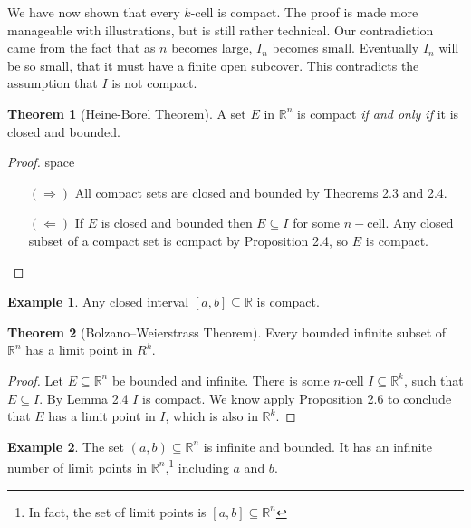 \documentclass{article}
\newcommand{\R}{\mathbb{R}}
\theoremstyle{definition}
\newtheorem{theorem}{Theorem}[section]
\newtheorem{example}{Example}[section]
\begin{document}
We have now shown that every $ k $-cell is compact. The proof is made more manageable with illustrations, but is still rather technical. Our contradiction came from the fact that as $ n $ becomes large, $ I_n $ becomes small. Eventually $ I_n $ will be so small, that it must have a finite open subcover. This contradicts the assumption that $ I $ is not compact. 
\begin{theorem}[Heine-Borel Theorem]
	A set $ E $ in $ \R^n $ is compact \textit{if and only if} it is closed and bounded.
\end{theorem} 
\begin{proof}{\color{white}space}
\begin{enumerate}
	\item [$ (\Longrightarrow) $] All compact sets are closed and bounded by Theorems 2.3 and 2.4. 
	\item [$ (\Longleftarrow) $] If $ E $ is closed and bounded then $ E\subseteq I $ for some $ n -$cell. Any closed subset of a compact set is compact by Proposition 2.4, so $ E $ is compact.
\end{enumerate}
\end{proof}
\begin{example}
	Any closed interval $ [a,b]\subseteq \R$ is compact. 
\end{example}
\begin{theorem}[Bolzano–Weierstrass Theorem]
	Every bounded infinite subset of $ \R^n $ has a limit point in $ R^k $. 
\end{theorem}
\begin{proof}
	Let $ E\subseteq\R^n $ be bounded and infinite. There is some $ n $-cell $ I\subseteq\R^k $, such that $ E\subseteq I $. By Lemma 2.4 $ I $ is compact. We know apply Proposition 2.6 to conclude that $ E $ has a limit point in $ I $, which is also in $ \R^k $.
\end{proof}
\begin{example}
	The set $ (a,b)\subseteq\R^n $ is infinite and bounded. It has an infinite number of limit points in $ \R^n $,\footnote{In fact, the set of limit points is $ [a,b]\subseteq\R^n $} including $ a $ and $ b $.
\end{example}
\end{document}
